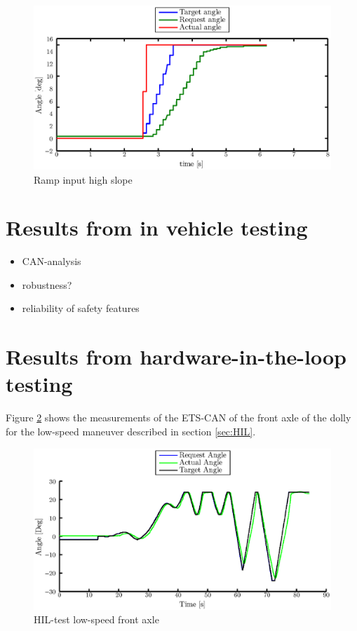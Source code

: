 \documentclass[ExampleMasters.tex]{subfiles}
\begin{document}
\begin{figure}[!hbt]
	\centering
	\includegraphics[width=1\linewidth]{figures/rate_limiter4}
	\caption{Ramp input high slope}
	
	\label{fig:rate_limiter4}
\end{figure}


\section{Results from in vehicle testing}
\label{sec:results_vehicle_testing}




\begin{itemize}
	\item CAN-analysis
	\item robustness?
	\item reliability of safety features
\end{itemize}
\section{Results from hardware-in-the-loop testing}

Figure \ref{fig:HIL002_front} shows the measurements of the ETS-CAN of the front axle of the dolly for the low-speed maneuver described in section \ref{sec:HIL}.\\

\begin{figure}[!htb]
	\centering
	\includegraphics[width=1\linewidth]{figures/HIL002_front}
	\caption{HIL-test low-speed front axle}
	
	\label{fig:HIL002_front}
\end{figure}
\end{document}
